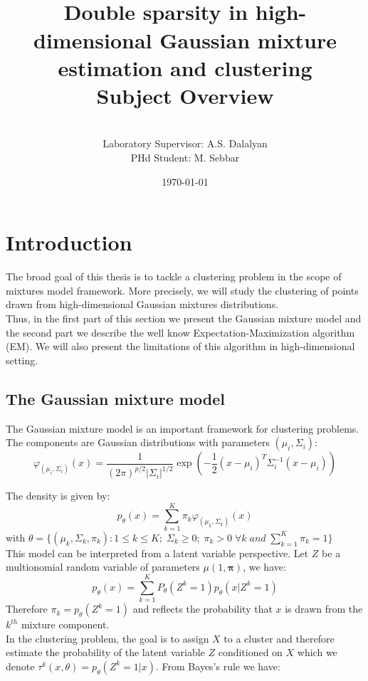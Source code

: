 \documentclass[12pt]{article}
\title{\vspace{-60pt}~\\Double sparsity in high-dimensional Gaussian mixture estimation and clustering\\Subject Overview}
\author{\vspace{-20pt}~\\ Laboratory Supervisor: A.S. Dalalyan\\
PHd Student: M. Sebbar}
\date{\today}
\def\bpi{\boldsymbol \pi}
\begin{document}
\maketitle
\tableofcontents
\newpage
\section{Introduction}
The broad goal of this thesis is to tackle a clustering problem in the scope of mixtures model framework. More precisely, we will study the clustering of points drawn from high-dimensional Gaussian mixtures distributions.\\Thus, in the first part of this section we present the Gaussian mixture model and the second part we describe the well know  Expectation-Maximization algorithm (EM). We will also present the limitations of this algorithm in high-dimensional setting.
\subsection{The Gaussian mixture model}

The Gaussian mixture model is an important framework for clustering problems. The components are Gaussian distributions with parameters $(\mu_i,\Sigma_i)$:
\begin{equation}
\varphi_{(\mu_i,\Sigma_i)}(x)=\frac{1}{(2\pi)^{p/2}|\Sigma_i|^{1/2}} \exp(-\frac{1}{2}(x-\mu_i)^T\Sigma_i^{-1}(x-\mu_i))
\end{equation}

The density is given by:
\begin{equation}
p_{\theta}(x)=\sum_{k=1}^K\pi_k\varphi_{(\mu_k,\Sigma_k)}(x)
\end{equation}
with $\theta=\{(\mu_k,\Sigma_k,\pi_k): 1\leq k\leq K; \; \Sigma_k \geq 0;\; \pi_k>0  \;\forall k\; and \;\sum_{k=1}^K\pi_k=1 \}$
\\

This model can be interpreted from a latent variable perspective. Let $Z$ be a multionomial random variable of parameters $\mu(1,\bpi)$, we have:
\begin{equation}
p_{\theta}(x)=\sum_{k=1}^K P_{\theta}(Z^k=1)p_{\theta}(x|Z^k=1)
\end{equation}
Therefore $\pi_k=p_{\theta}(Z^k=1)$ and reflects the probability that $x$ is drawn from the $k^{th}$ mixture component.\\

In the clustering problem, the goal is to assign $X$ to a cluster and therefore estimate the probability of the latent variable $Z$ conditioned on $X$ which we denote $\tau^k(x,\theta)=p_{\theta}(Z^k=1|x)$. From Bayes's rule we have:
\end{document}
